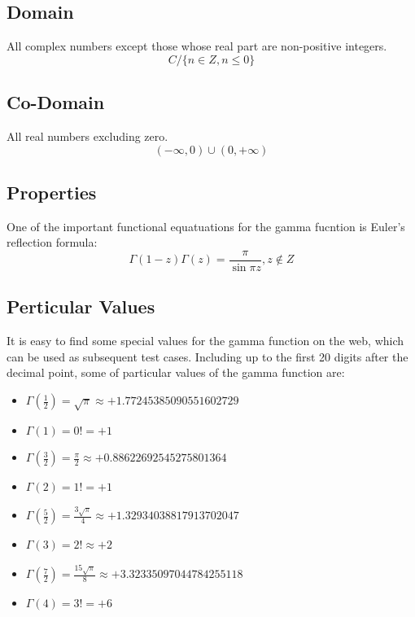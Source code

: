 \documentclass{report}
\begin{document}
\subsection{Domain}
All complex numbers except those whose real part are non-positive integers.
\\$$C/\{n\in Z, n\le 0\}$$
\subsection{Co-Domain}
All real numbers excluding zero.
\\$$\left ( -\infty,0  \right )\cup \left ( 0,+\infty  \right )$$
\subsection{Properties}
One of the important functional equatuations for the gamma fucntion is Euler's reflection formula:
\\$$\Gamma \left ( 1-z \right ) \Gamma \left ( z \right ) =\frac{\pi }{\sin \pi z},  z \notin Z $$ 
\subsection{Perticular Values}
It is easy to find some special values for the gamma function on the web, which can be used as subsequent test cases. Including up to the first 20 digits after the decimal point, some of particular values of the gamma function are\cite{enwiki:1102366902}:
\begin{itemize}
\item $\Gamma \left ( \frac{1}{2}  \right ) =\sqrt{\pi }  \approx +1.77245385090551602729$
\item $\Gamma \left ( 1  \right ) =0! = +1$
\item $\Gamma \left ( \frac{3}{2}  \right ) =\frac{\pi }{2}   \approx +0.88622692545275801364$
\item $\Gamma \left ( 2 \right ) =1!=+1$
\item $\Gamma \left ( \frac{5}{2}  \right ) =\frac{3\sqrt{\pi } }{4} \approx +1.32934038817913702047$
\item $\Gamma \left ( 3  \right ) =2! \approx +2$
\item $\Gamma \left ( \frac{7}{2}   \right ) =\frac{15\sqrt{\pi } }{8}  \approx +3.32335097044784255118$
\item $\Gamma \left ( 4 \right ) =3!=+6$
\end{itemize}
\end{document}
